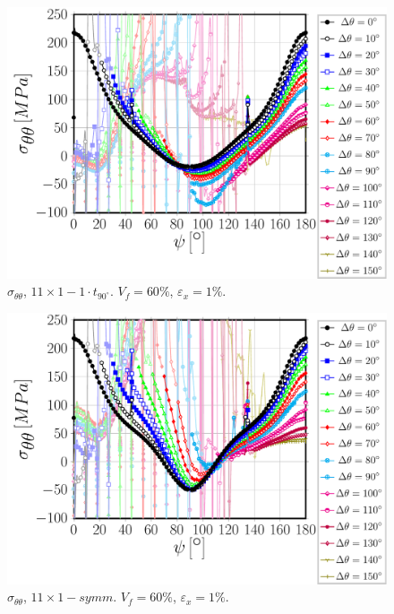 \documentclass[review]{elsarticle}
\begin{document}
\begin{figure}[!h]
\centering
\includegraphics[width=\textwidth]{S5A0T1-circum-sigmatt.pdf}
\caption{$\sigma_{\theta\theta}$, $11\times 1-1\cdot t_{90^{\circ}}$. $V_{f}=60\%$, $\varepsilon_{x}=1\%$.}\label{}
\end{figure}

\begin{figure}[!h]
\centering
\includegraphics[width=\textwidth]{S5A0vk-circum-sigmatt.pdf}
\caption{$\sigma_{\theta\theta}$, $11\times 1-symm$. $V_{f}=60\%$, $\varepsilon_{x}=1\%$.}\label{}
\end{figure}
\end{document}
